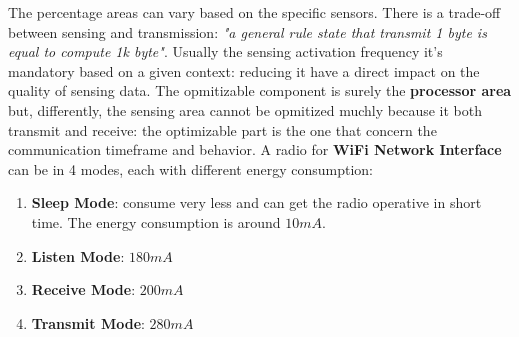 \documentclass[10pt,a4paper]{report}
\theoremstyle{definition}
\begin{document}
The percentage areas can vary based on the specific sensors. There is a trade-off between sensing and transmission: \textit{"a general rule state that transmit 1 byte is equal to compute 1k byte"}.
Usually the sensing activation frequency it's mandatory based on a given context: reducing it have a direct impact on the quality of sensing data. The opmitizable component is surely the \textbf{processor area} but, differently, the sensing area cannot be opmitized muchly because it both transmit and receive: the optimizable part is the one that concern the communication timeframe and behavior.
A radio for \textbf{WiFi Network Interface} can be in 4 modes, each with different energy consumption:
\begin{enumerate}
	\item 
	\textbf{Sleep Mode}: consume very less and can get the radio operative in short time. The energy consumption is around $10mA$.
	\item 
	\textbf{Listen Mode}: $180mA$
	\item 
	\textbf{Receive Mode}: $200mA$
	\item 
	\textbf{Transmit Mode}: $280 mA$
\end{enumerate}
\end{document}
